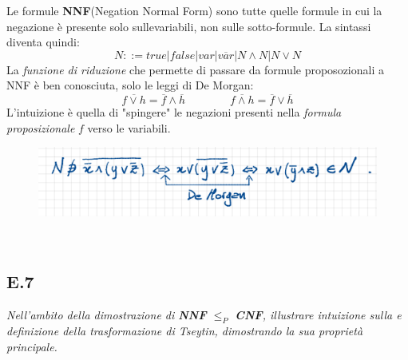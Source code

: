 \documentclass[a4paper]{article}
\begin{document}
Le formule \textbf{NNF}(Negation Normal Form) sono tutte quelle formule in cui la negazione è presente solo sullevariabili, non sulle sotto-formule.
La sintassi diventa quindi:
$$ N ::= true|false|var|\overline{var}|N \land N|N \lor N$$
La \textit{funzione di riduzione} che permette di passare da formule proposozionali a NNF è ben conosciuta, solo le leggi di De Morgan:
$$ \overline{f \lor h} = \overline{f} \land \overline{h} \qquad \qquad \overline{f \land h} = \overline{f} \lor \overline{h}$$
L'intuizione è quella di "spingere" le negazioni presenti nella \textit{formula proposizionale} $f$ verso le variabili.\\
\begin{figure}[!ht]
                \centering
                \includegraphics[width = 1\textwidth]{./img/E6.png}
\end{figure}\\
\subsection{E.7}
\emph{Nell’ambito della dimostrazione di \textbf{NNF} $\leq_P$ \textbf{CNF}, illustrare intuizione sulla e definizione della trasformazione di Tseytin, dimostrando la sua proprietà principale.}
\end{document}
